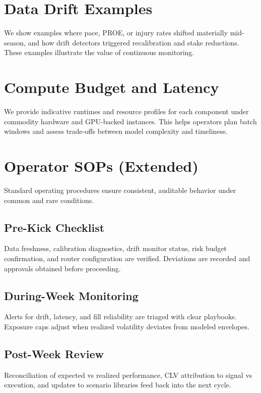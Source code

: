 \section{Data Drift Examples}\label{app:drift-examples}
We show examples where pace, PROE, or injury rates shifted materially mid-season, and how drift detectors triggered recalibration and stake reductions. These examples illustrate the value of continuous monitoring.

\section{Compute Budget and Latency}\label{app:compute}
We provide indicative runtimes and resource profiles for each component under commodity hardware and GPU-backed instances. This helps operators plan batch windows and assess trade-offs between model complexity and timeliness.

\section{Operator SOPs (Extended)}\label{app:sops}
Standard operating procedures ensure consistent, auditable behavior under common and rare conditions.

\subsection{Pre-Kick Checklist}
Data freshness, calibration diagnostics, drift monitor status, risk budget confirmation, and router configuration are verified. Deviations are recorded and approvals obtained before proceeding.

\subsection{During-Week Monitoring}
Alerts for drift, latency, and fill reliability are triaged with clear playbooks. Exposure caps adjust when realized volatility deviates from modeled envelopes.

\subsection{Post-Week Review}
Reconciliation of expected vs realized performance, CLV attribution to signal vs execution, and updates to scenario libraries feed back into the next cycle.

